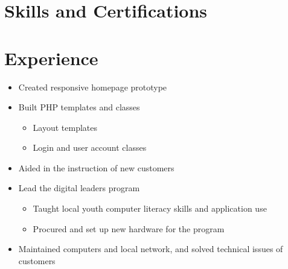 \documentclass[11pt,sans]{moderncv}
\begin{document}
\makecvtitle

\vspace{-7mm}

\section{Skills and Certifications}




\section{Experience}


\begin{itemize}
	\item Created responsive homepage prototype
	\item Built PHP templates and classes
	\begin{itemize}
		\item Layout templates
		\item Login and user account classes
	\end{itemize}
\end{itemize}

\vspace{2mm}


\begin{itemize}
\item Aided in the instruction of new customers
\item Lead the digital leaders program
\begin{itemize}
	\item Taught local youth computer literacy skills and application use
	\item Procured and set up new hardware for the program
\end{itemize}
\item Maintained computers and local network, and solved technical issues of customers
\end{itemize}
\end{document}

